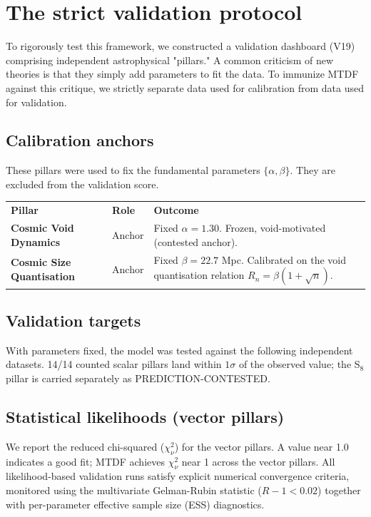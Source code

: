 \documentclass[11pt,a4paper]{article}
\begin{document}
\section{The strict validation protocol}
\label{sec:sec7}
To rigorously test this framework, we constructed a validation dashboard (V19) comprising independent astrophysical "pillars." A common criticism of new theories is that they simply add parameters to fit the data. To immunize MTDF against this critique, we strictly separate data used for calibration from data used for validation.

\subsection{Calibration anchors}
These pillars were used to fix the fundamental parameters $\{\alpha, \beta\}$. They are excluded from the validation score.

\begin{table}[H]
\centering
\footnotesize
\begin{tabularx}{\linewidth}{l>{\RaggedRight\arraybackslash}X>{\RaggedRight\arraybackslash}X}
\toprule
\textbf{Pillar} & \textbf{Role} & \textbf{Outcome} \tabularnewline
\textbf{Cosmic Void Dynamics} & Anchor & Fixed $\alpha = 1.30$. Frozen, void-motivated (contested anchor). \tabularnewline
\textbf{Cosmic Size Quantisation} & Anchor & Fixed $\beta = 22.7$ Mpc. Calibrated on the void quantisation relation $R_n = \beta(1 + \sqrt{n})$. \tabularnewline
\bottomrule
\end{tabularx}
\end{table}

\subsection{Validation targets}
With parameters fixed, the model was tested against the following independent datasets. 14/\allowbreak{}14 counted scalar pillars land within $1\sigma$ of the observed value; the S$_8$ pillar is carried separately as PREDICTION-CONTESTED.

\subsection{Statistical likelihoods (vector pillars)}
We report the reduced chi-squared ($\chi^2_\nu$) for the vector pillars. A value near 1.0 indicates a good fit; MTDF achieves $\chi^2_\nu$ near 1 across the vector pillars. All likelihood-based validation runs satisfy explicit numerical convergence criteria, monitored using the multivariate Gelman-Rubin statistic ($R-1 < 0.02$) together with per-parameter effective sample size (ESS) diagnostics.
\end{document}
